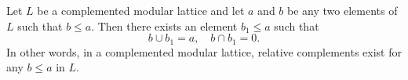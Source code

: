 Let $L$ be a complemented modular lattice and let $a$ and $b$ be any two elements of $L$ such that $b \leq a$. Then there exists an element $b_1 \leq a$ such that
$$b \cup b_1 = a, \quad b \cap b_1 = 0.$$
In other words, in a complemented modular lattice, relative complements exist for any $b \leq a$ in $L$.
